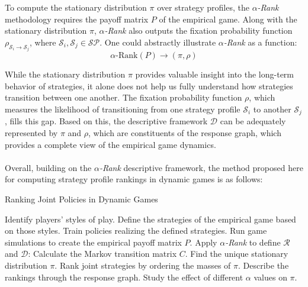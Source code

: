 \begin{flushleft}
\begin{flushleft}
        To compute the stationary distribution $\pi$ over strategy profiles, the \emph{$\alpha$-Rank} methodology requires the payoff matrix $P$ of the empirical game. Along with the stationary distribution $\pi$, \emph{$\alpha$-Rank} also outputs the fixation probability function $\rho_{\mathcal{S}_i \to \mathcal{S}_j}$, where $\mathcal{S}_i, \mathcal{S}_j \in \mathcal{SP}$. One could abstractly illustrate \emph{$\alpha$-Rank} as a function:
        \begin{equation}
            \alpha\text{-Rank}(P) \rightarrow (\pi, \rho) 
            \label{eq:abstract_arank}
        \end{equation}

        While the stationary distribution $\pi$ provides valuable insight into the long-term behavior of strategies, it alone does not help us fully understand how strategies transition between one another. The fixation probability function $\rho$, which measures the likelihood of transitioning from one strategy profile $\mathcal{S}_i$ to another $\mathcal{S}_j$, fills this gap. Based on this, the descriptive framework $\mathcal{D}$ can be adequately represented by $\pi$ and $\rho$, which are constituents of the response graph, which provides a complete view of the empirical game dynamics.\\~\\

        Overall, building on the \emph{$\alpha$-Rank} descriptive framework, the method proposed here for computing strategy profile rankings in dynamic games is as follows:
        \begin{algorithm}
            \caption{Ranking Joint Policies in Dynamic Games}
            \begin{algorithmic}[1]
                \vspace{0.5em}
                \STATE Identify players' styles of play.
                \STATE Define the strategies of the empirical game based on those styles.
                \STATE Train policies realizing the defined strategies.
                \STATE Run game simulations to create the empirical payoff matrix $P$.
                \STATE Apply \emph{$\alpha$-Rank} to define $\mathcal{R}$ and $\mathcal{D}$:
                \vspace{0.5em}
                \STATE \hspace{1em} Calculate the Markov transition matrix $C$.
                \STATE \hspace{1em} Find the unique stationary distribution $\pi$.
                \STATE \hspace{1em} Rank joint strategies by ordering the masses of $\pi$.
                \STATE \hspace{1em} Describe the rankings through the response graph.
                \STATE \hspace{1em} Study the effect of different $\alpha$ values on $\pi$.
            \end{algorithmic}
        \end{algorithm}

    \end{flushleft}

\end{flushleft}